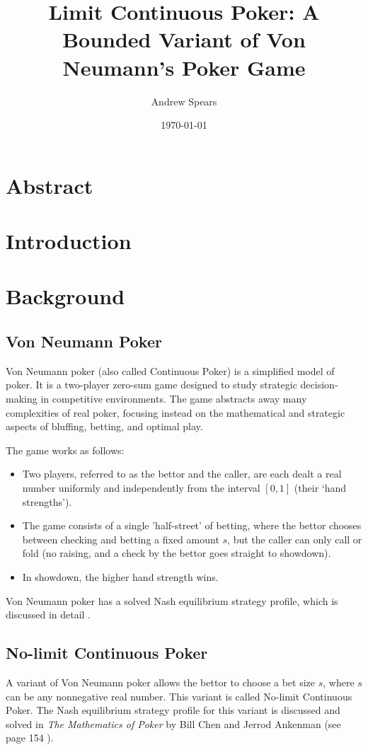 \documentclass[a4paper,12pt]{article}
\title{Limit Continuous Poker: A Bounded Variant of Von Neumann's Poker Game}
\author{Andrew Spears}
\date{\today}
\begin{document}
\maketitle

\section{Abstract}

\section{Introduction}

\section{Background}

\subsection{Von Neumann Poker}
Von Neumann poker (also called Continuous Poker) is a simplified model of poker. It is a two-player zero-sum game designed to study strategic decision-making in competitive environments. The game abstracts away many complexities of real poker, focusing instead on the mathematical and strategic aspects of bluffing, betting, and optimal play.

The game works as follows:
\begin{itemize}
    \item Two players, referred to as the bettor and the caller, are each dealt a real number uniformly and independently from the interval $[0, 1]$ (their `hand strengths').
    \item The game consists of a single 'half-street' of betting, where the bettor chooses between checking and betting a fixed amount $s$, but the caller can only call or fold (no raising, and a check by the bettor goes straight to showdown).
    \item In showdown, the higher hand strength wins.
\end{itemize}

Von Neumann poker has a solved Nash equilibrium strategy profile, which is discussed in detail .

\subsection{No-limit Continuous Poker}
A variant of Von Neumann poker allows the bettor to choose a bet size $s$, where $s$ can be any nonnegative real number. This variant is called No-limit Continuous Poker. The Nash equilibrium strategy profile for this variant is discussed and solved in \textit{The Mathematics of Poker} by Bill Chen and Jerrod Ankenman (see page 154 ).
\end{document}
